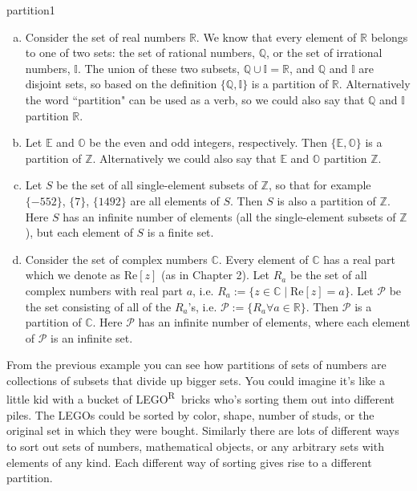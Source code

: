 \begin{example}{partition1}
\begin{enumerate}[(a)]
\item Consider the set of real numbers $\mathbb{R}$. We know that every element of $\mathbb{R}$ belongs to one of two sets: the set of rational numbers, $\mathbb{Q}$, or the set of irrational numbers, $\mathbb{I}$. The union of these two subsets, $\mathbb{Q} \cup \mathbb{I}=\mathbb{R}$, and $\mathbb{Q}$ and $\mathbb{I}$ are disjoint sets, so based on the definition $\{\mathbb{Q},\mathbb{I}\}$ is a partition of $\mathbb{R}$. Alternatively the word ``partition" can be used as a verb, so we could also say that $\mathbb{Q}$ and $\mathbb{I}$ partition $\mathbb{R}$.
\item Let $\mathbb{E}$ and $\mathbb{O}$ be the even and odd integers, respectively. Then $\{\mathbb{E},\mathbb{O}\}$ is a partition of $\mathbb{Z}$. Alternatively we could also say that $\mathbb{E}$ and $\mathbb{O}$ partition $\mathbb{Z}$.
\item Let $S$ be the set of all single-element subsets of $\mathbb{Z}$, so that for example $\{-552\}$, $\{7\}$, $\{1492\}$ are all elements of $S$. Then $S$ is also a partition of $\mathbb{Z}$. Here $S$ has an infinite number of elements (all the single-element subsets of $\mathbb{Z}$), but each element of $S$ is a finite set.
\item Consider the set of complex numbers $\mathbb{C}$. Every element of $\mathbb{C}$ has a real part which we denote as Re$[z]$ (as in Chapter 2). Let $R_a$ be the set of all complex numbers with real part $a$, i.e. $R_a:=\{z \in \mathbb{C} \mid \text{Re}[z]=a\}$. Let $\mathcal{P}$ be the set consisting of all of the $R_a$'s, i.e. $\mathcal{P}:=\{R_a \forall a \in \mathbb{R}\}$. Then $\mathcal{P}$ is a partition of $\mathbb{C}$. Here $\mathcal{P}$ has an infinite number of elements, where each element of $\mathcal{P}$ is an infinite set.
\end{enumerate}
\end{example}

From the previous example you can see how partitions of sets of numbers are collections of subsets that divide up bigger sets. You could imagine it's like a little kid with a bucket of LEGO\textsuperscript{\textcircled{{\scriptsize R}}} bricks who's sorting them out into different piles. The LEGOs could be sorted by color, shape, number of studs, or the original set in which they were bought. Similarly there are lots of different ways to sort out sets of numbers, mathematical objects, or any arbitrary sets with elements of any kind. Each different way of sorting gives rise to a different partition.

